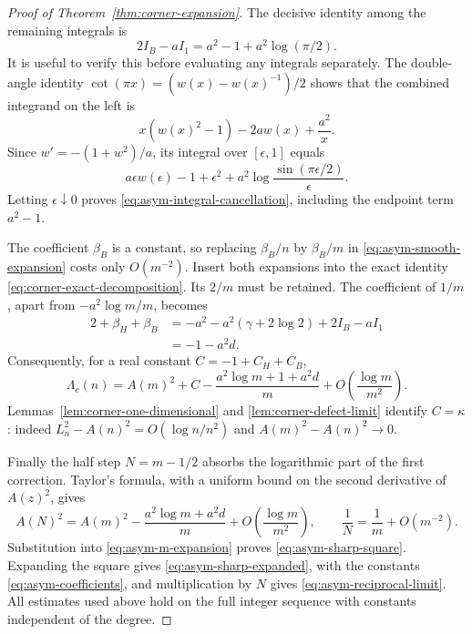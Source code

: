 \begin{proof}[Proof of Theorem~\ref{thm:corner-expansion}]
The decisive identity among the remaining integrals is
\begin{equation}\label{eq:asym-integral-cancellation}
 2I_B-aI_1=a^2-1+a^2\log(\pi/2).
\end{equation}
It is useful to verify this before evaluating any integrals separately.
The double-angle identity
$\cot(\pi x)=(w(x)-w(x)^{-1})/2$ shows that the combined
integrand on the left is
\[
 x(w(x)^2-1)-2aw(x)+\frac{a^2}{x}.
\]
Since $w'=-(1+w^2)/a$, its integral over $[\epsilon,1]$ equals
\[
 a\epsilon w(\epsilon)-1+\epsilon^2
       +a^2\log\frac{\sin(\pi\epsilon/2)}{\epsilon}.
\]
Letting $\epsilon\downarrow0$ proves
\eqref{eq:asym-integral-cancellation}, including the endpoint term
$a^2-1$.

The coefficient $\beta_B$ is a constant, so replacing $\beta_B/n$
by $\beta_B/m$ in \eqref{eq:asym-smooth-expansion} costs only
$O(m^{-2})$.  Insert both expansions into the exact identity
\eqref{eq:corner-exact-decomposition}.  Its $2/m$ must be retained.
The coefficient of $1/m$, apart from $-a^2\log m/m$, becomes
\begin{align*}
 2+\beta_H+\beta_B
 &=-a^2-a^2(\gamma+2\log2)+2I_B-aI_1\\
 &=-1-a^2d.
\end{align*}
Consequently, for a real constant $C=-1+C_H+C_B$,
\begin{equation}\label{eq:asym-m-expansion}
 \Lambda_c(n)=A(m)^2+C
       -\frac{a^2\log m+1+a^2d}{m}
       +O\!\left(\frac{\log m}{m^2}\right).
\end{equation}
Lemmas~\ref{lem:corner-one-dimensional} and
\ref{lem:corner-defect-limit} identify $C=\kappa$: indeed
$L_n^2-A(n)^2=O(\log n/n^2)$ and
$A(m)^2-A(n)^2\to0$.

Finally the half step $N=m-1/2$ absorbs the logarithmic part of the
first correction.  Taylor's formula, with a uniform bound on the second
derivative of $A(z)^2$, gives
\[
 A(N)^2=A(m)^2-\frac{a^2\log m+a^2d}{m}
                       +O\!\left(\frac{\log m}{m^2}\right),
 \qquad \frac1N=\frac1m+O(m^{-2}).
\]
Substitution into \eqref{eq:asym-m-expansion} proves
\eqref{eq:asym-sharp-square}.  Expanding the square gives
\eqref{eq:asym-sharp-expanded}, with the constants
\eqref{eq:asym-coefficients}, and multiplication by $N$ gives
\eqref{eq:asym-reciprocal-limit}.  All estimates used above hold
on the full integer sequence with constants independent of the degree.
\end{proof}
